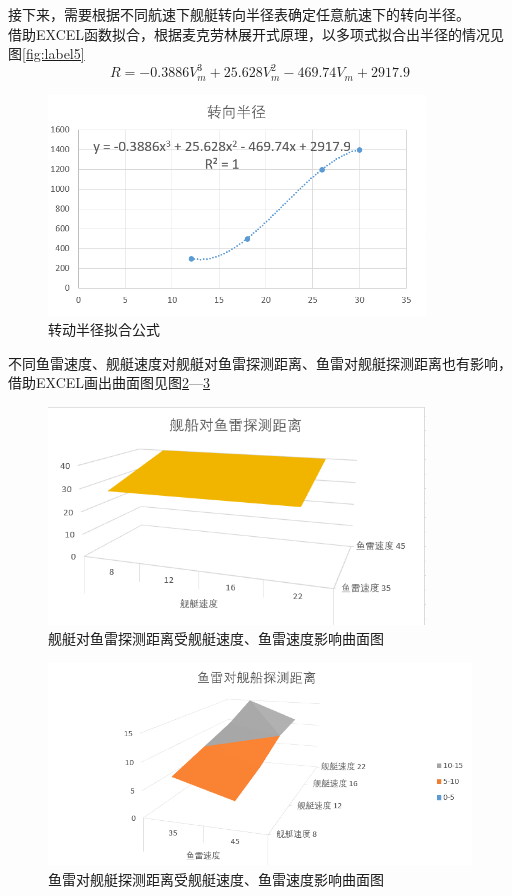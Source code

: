 \documentclass[12pt]{article}%
\begin{document}
接下来，需要根据不同航速下舰艇转向半径表确定任意航速下的转向半径。\\借助EXCEL函数拟合，根据麦克劳林展开式原理，以多项式拟合出半径的情况见图\ref{fig:label5}
\begin{equation}\label{1}
R=-0.3886V_m^3+25.628V_m^2-469.74V_m+2917.9
\end{equation}
\begin{figure}[htb]
\centering
\includegraphics[width=10cm]{TIM20180528164001.png}
\caption{\heiti 转动半径拟合公式}
\label{fig:label}
\end{figure}

不同鱼雷速度、舰艇速度对舰艇对鱼雷探测距离、鱼雷对舰艇探测距离也有影响，借助EXCEL画出曲面图见图\ref{fig:label6}—\ref{fig:label7}
\begin{figure}[htb]
\centering
\includegraphics[width=10cm]{TIM20180528164726.png}
\caption{\heiti 舰艇对鱼雷探测距离受舰艇速度、鱼雷速度影响曲面图}
\label{fig:label6}
\end{figure}
\begin{figure}[htb]
\centering
\includegraphics[width=12cm]{TIM20180528165255.png}
\caption{\heiti 鱼雷对舰艇探测距离受舰艇速度、鱼雷速度影响曲面图}
\label{fig:label7}
\end{figure}
\end{document}
